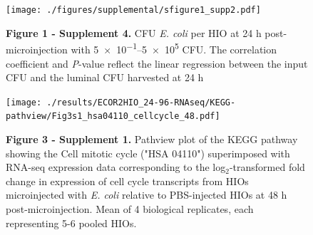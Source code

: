 \documentclass[9pt,lineo]{elife}
\begin{document}
\begin{figure}
\begin{fullwidth} \centering\texttt{[image: ./figures/supplemental/sfigure1\_supp2.pdf]}
\caption*{\textbf{Figure 1 - Supplement 4. } CFU \textit{E. coli} per HIO at 24 h post-microinjection with \numrange{5e-1}{5e5} CFU. The correlation coefficient and \textit{P}-value reflect the linear regression between the input CFU and the luminal CFU harvested at 24 h}
\label{fig:fullwidth}
\end{fullwidth}
\end{figure}
\begin{figure}
\begin{fullwidth}
\centering\texttt{[image: ./results/ECOR2HIO\_24-96-RNAseq/KEGG-pathview/Fig3s1\_hsa04110\_cellcycle\_48.pdf]}
\caption*{\textbf{Figure 3 - Supplement 1. } Pathview \citep{pathview:2013} plot of the KEGG \citep{Kanehisa:2000} pathway showing the Cell mitotic cycle ("HSA 04110") superimposed with RNA-seq expression data corresponding to the log$_{2}$-transformed fold change in expression of cell cycle transcripts from HIOs microinjected with \textit{E. coli} relative to PBS-injected HIOs at 48 h post-microinjection. Mean of 4 biological replicates, each representing 5-6 pooled HIOs.}
\label{fig:fullwidth}
\end{fullwidth}
\end{figure}
\end{document}
